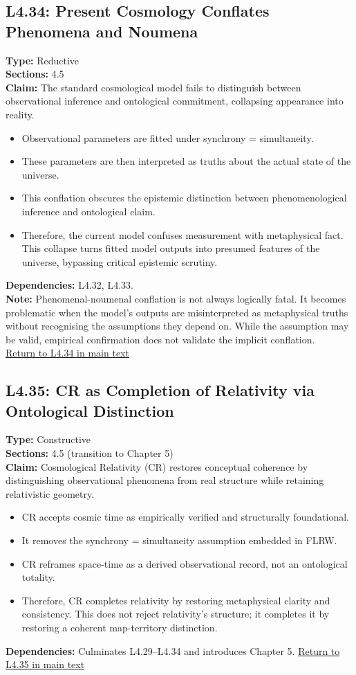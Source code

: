 \documentclass[12pt]{book}
\newcommand{\returnlink}[1]{\hyperref[logic:#1]{Return to #1 in main text}\xspace}
\begin{document}
\subsection*{L4.34: Present Cosmology Conflates Phenomena and Noumena}
\label{appendix:L4.34}
\textbf{Type:} Reductive \\
\textbf{Sections:} 4.5 \\
\textbf{Claim:} The standard cosmological model fails to distinguish between observational inference and ontological commitment, collapsing appearance into reality.
\begin{itemize}
  \item Observational parameters are fitted under synchrony = simultaneity.
  \item These parameters are then interpreted as truths about the actual state of the universe.
  \item This conflation obscures the epistemic distinction between phenomenological inference and ontological claim.
  \item Therefore, the current model confuses measurement with metaphysical fact. This collapse turns fitted model outputs into presumed features of the universe, bypassing critical epistemic scrutiny.
\end{itemize}
\textbf{Dependencies:} L4.32, L4.33.\\
\textbf{Note:} Phenomenal-noumenal conflation is not always logically fatal. It becomes problematic when the model's outputs are misinterpreted as metaphysical truths without recognising the assumptions they depend on. While the assumption may be valid, empirical confirmation does not validate the implicit conflation.\\
\returnlink{L4.34}

\subsection*{L4.35: CR as Completion of Relativity via Ontological Distinction}
\label{appendix:L4.35}
\textbf{Type:} Constructive \\
\textbf{Sections:} 4.5 (transition to Chapter 5) \\
\textbf{Claim:} Cosmological Relativity (CR) restores conceptual coherence by distinguishing observational phenomena from real structure while retaining relativistic geometry.
\begin{itemize}
  \item CR accepts cosmic time as empirically verified and structurally foundational.
  \item It removes the synchrony = simultaneity assumption embedded in FLRW.
  \item CR reframes space-time as a derived observational record, not an ontological totality.
  \item Therefore, CR completes relativity by restoring metaphysical clarity and consistency. This does not reject relativity's structure; it completes it by restoring a coherent map-territory distinction.
\end{itemize}
\textbf{Dependencies:} Culminates L4.29–L4.34 and introduces Chapter 5.
\returnlink{L4.35}
\end{document}
